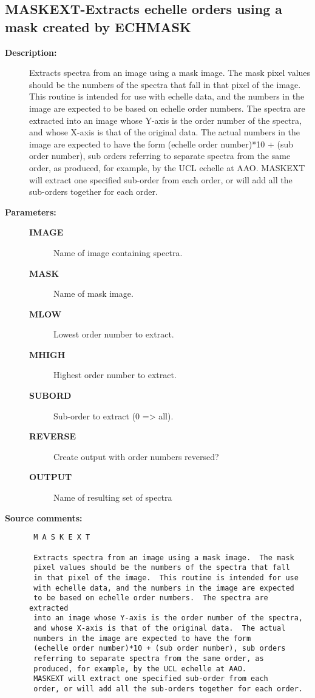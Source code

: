 \subsection{MASKEXT-\label{MASKEXT}Extracts echelle orders using a mask created by ECHMASK}
\begin{description}

\item [{\bf Description:}]
 Extracts spectra from an image using a mask image.  The mask
 pixel values should be the numbers of the spectra that fall
 in that pixel of the image.  This routine is intended for use
 with echelle data, and the numbers in the image are expected
 to be based on echelle order numbers.  The spectra are extracted
 into an image whose Y-axis is the order number of the spectra,
 and whose X-axis is that of the original data.  The actual
 numbers in the image are expected to have the form
 (echelle order number)*10 + (sub order number), sub orders
 referring to separate spectra from the same order, as
 produced, for example, by the UCL echelle at AAO.
 MASKEXT will extract one specified sub-order from each
 order, or will add all the sub-orders together for each order.

\item [{\bf Parameters:}]
\begin{description}
\item [{\bf IMAGE}]
 Name of image containing spectra.
\item [{\bf MASK}]
 Name of mask image.
\item [{\bf MLOW}]
 Lowest order number to extract.
\item [{\bf MHIGH}]
 Highest order number to extract.
\item [{\bf SUBORD}]
 Sub-order to extract (0 => all).
\item [{\bf REVERSE}]
 Create output with order numbers reversed?
\item [{\bf OUTPUT}]
 Name of resulting set of spectra
\end{description}

\item [{\bf Source comments:}]
\begin{verbatim}
 M A S K E X T

 Extracts spectra from an image using a mask image.  The mask
 pixel values should be the numbers of the spectra that fall
 in that pixel of the image.  This routine is intended for use
 with echelle data, and the numbers in the image are expected
 to be based on echelle order numbers.  The spectra are extracted
 into an image whose Y-axis is the order number of the spectra,
 and whose X-axis is that of the original data.  The actual
 numbers in the image are expected to have the form
 (echelle order number)*10 + (sub order number), sub orders
 referring to separate spectra from the same order, as
 produced, for example, by the UCL echelle at AAO.
 MASKEXT will extract one specified sub-order from each
 order, or will add all the sub-orders together for each order.


\end{verbatim}
\end{description}
